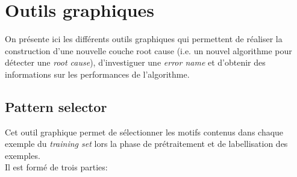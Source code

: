 \section{Outils graphiques}
\label{Industrialisation du produit: Outils graphiques}
On présente ici les différents outils graphiques qui permettent de réaliser la construction d'une nouvelle couche root cause (i.e. un nouvel algorithme pour détecter une \emph{root cause}), d'investiguer une \emph{error name} et d'obtenir des informations sur les performances de l'algorithme. 

\subsection{Pattern selector}
\label{Industrialisation du produit: Outils graphiques: Pattern selection}
Cet outil graphique permet de sélectionner les motifs contenus dans chaque exemple du \emph{training set} lors la phase de prétraitement  et de labellisation des exemples. \\
Il est formé de trois parties:
